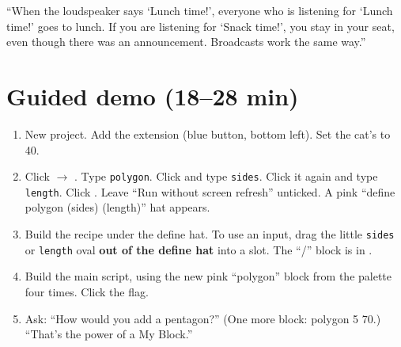 \begin{analogy}
\enquote{When the loudspeaker says \enquote{Lunch time!}, everyone who is listening for \enquote{Lunch time!} goes to lunch. If you are listening for \enquote{Snack time!}, you stay in your seat, even though there was an announcement. Broadcasts work the same way.}
\end{analogy}

\section{Guided demo (18--28 min)}
\begin{workedexample}
\begin{enumerate}[leftmargin=1.4em,itemsep=1pt]
  \item New project. Add the  extension (blue button, bottom left). Set the cat's  to 40.
  \item Click  $\rightarrow$ . Type \texttt{polygon}. Click  and type \texttt{sides}. Click it again and type \texttt{length}. Click . Leave \enquote{Run without screen refresh} unticked. A pink \enquote{define polygon (sides) (length)} hat appears.
  \item Build the recipe under the define hat. To use an input, drag the little \texttt{sides} or \texttt{length} oval \textbf{out of the define hat} into a slot. The \enquote{/} block is in .
  \item Build the main script, using the new pink \enquote{polygon} block from the palette four times. Click the flag.
  \item Ask: \enquote{How would you add a pentagon?} (One more block: polygon 5 70.) \enquote{That's the power of a My Block.}
\end{enumerate}
\begin{center}
\begin{scratch}[scale=0.78]
\end{scratch}
\hspace{0.8cm}
\begin{scratch}[scale=0.78]
\end{scratch}
\end{center}
\end{workedexample}

